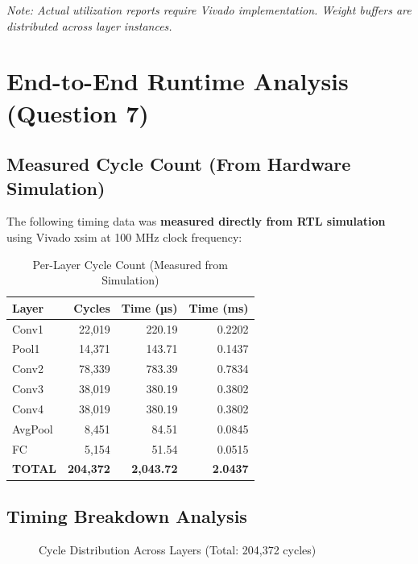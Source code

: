 \documentclass[11pt,a4paper]{article}
\begin{document}
\textit{Note: Actual utilization reports require Vivado implementation. Weight buffers are distributed across layer instances.}

\section{End-to-End Runtime Analysis (Question 7)}

\subsection{Measured Cycle Count (From Hardware Simulation)}

The following timing data was \textbf{measured directly from RTL simulation} using Vivado xsim at 100 MHz clock frequency:

\begin{table}[H]
\centering
\caption{Per-Layer Cycle Count (Measured from Simulation)}
\begin{tabular}{lrrr}
\toprule
\textbf{Layer} & \textbf{Cycles} & \textbf{Time (µs)} & \textbf{Time (ms)} \\
\midrule
Conv1 & 22,019 & 220.19 & 0.2202 \\
Pool1 & 14,371 & 143.71 & 0.1437 \\
Conv2 & 78,339 & 783.39 & 0.7834 \\
Conv3 & 38,019 & 380.19 & 0.3802 \\
Conv4 & 38,019 & 380.19 & 0.3802 \\
AvgPool & 8,451 & 84.51 & 0.0845 \\
FC & 5,154 & 51.54 & 0.0515 \\
\midrule
\textbf{TOTAL} & \textbf{204,372} & \textbf{2,043.72} & \textbf{2.0437} \\
\bottomrule
\end{tabular}
\end{table}

\subsection{Timing Breakdown Analysis}

\begin{figure}[H]
\centering
{}
\caption{Cycle Distribution Across Layers (Total: 204,372 cycles)}
\end{figure}
\end{document}
